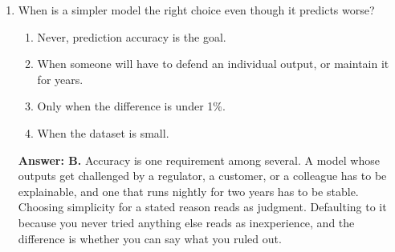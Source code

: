 \documentclass[11pt]{article}
\begin{document}
\begin{enumerate}[itemsep=14pt]
\vspace{2pt}
\textbf{Answer: C.} Survival was conditional on clearing a threshold, so the survivors are enriched for estimates that happened to land high. The reported intervals and $p$-values are computed as if the model had been fixed in advance, which it was not. Report out-of-sample performance instead, or validate on fresh data.
\vspace{4pt}

\item When is a simpler model the right choice even though it predicts worse?

\begin{enumerate}[label=\Alph*., itemsep=1pt, topsep=3pt]
  \item Never, prediction accuracy is the goal.
  \item When someone will have to defend an individual output, or maintain it for years.
  \item Only when the difference is under 1\%.
  \item When the dataset is small.
\end{enumerate}

\vspace{2pt}
\textbf{Answer: B.} Accuracy is one requirement among several. A model whose outputs get challenged by a regulator, a customer, or a colleague has to be explainable, and one that runs nightly for two years has to be stable. Choosing simplicity for a stated reason reads as judgment. Defaulting to it because you never tried anything else reads as inexperience, and the difference is whether you can say what you ruled out.
\vspace{4pt}

\end{enumerate}
\end{document}
